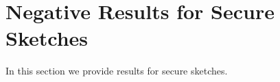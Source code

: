 
\section{Negative Results for Secure Sketches}
In this section we provide results for secure sketches.